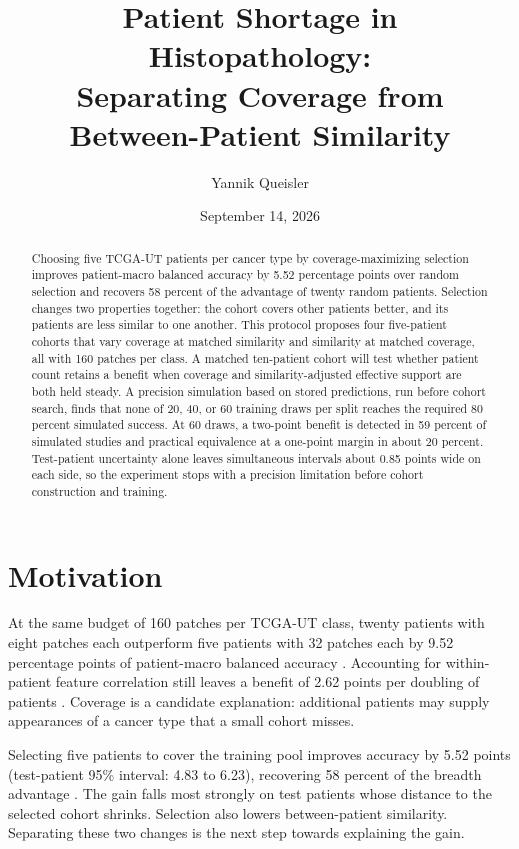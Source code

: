 \documentclass[11pt]{article}
\title{Patient Shortage in Histopathology:\\Separating Coverage from\\Between-Patient Similarity}
\author{Yannik Queisler}
\date{September 14, 2026}
\begin{document}
\raggedbottom
{}
\setlength{\emergencystretch}{2em}
\maketitle
\begin{abstract}
\noindent Choosing five TCGA-UT patients per cancer type by coverage-maximizing selection improves patient-macro balanced accuracy by 5.52 percentage points over random selection and recovers 58 percent of the advantage of twenty random patients. Selection changes two properties together: the cohort covers other patients better, and its patients are less similar to one another. This protocol proposes four five-patient cohorts that vary coverage at matched similarity and similarity at matched coverage, all with 160 patches per class. A matched ten-patient cohort will test whether patient count retains a benefit when coverage and similarity-adjusted effective support are both held steady. A precision simulation based on stored predictions, run before cohort search, finds that none of 20, 40, or 60 training draws per split reaches the required 80 percent simulated success. At 60 draws, a two-point benefit is detected in 59 percent of simulated studies and practical equivalence at a one-point margin in about 20 percent. Test-patient uncertainty alone leaves simultaneous intervals about 0.85 points wide on each side, so the experiment stops with a precision limitation before cohort construction and training.
\end{abstract}
\setcounter{tocdepth}{1}
\tableofcontents
\clearpage

\section{Motivation}
\label{sec:motivation}
At the same budget of 160 patches per TCGA-UT class, twenty patients with eight patches each outperform five patients with 32 patches each by 9.52 percentage points of patient-macro balanced accuracy \citep{queisler2026effectiveSupport}. Accounting for within-patient feature correlation still leaves a benefit of 2.62 points per doubling of patients \citep{queisler2026multidirectionalRedundancy}. Coverage is a candidate explanation: additional patients may supply appearances of a cancer type that a small cohort misses.

Selecting five patients to cover the training pool improves accuracy by 5.52 points (test-patient 95\% interval: 4.83 to 6.23), recovering 58 percent of the breadth advantage \citep{queisler2026shortageSelection}. The gain falls most strongly on test patients whose distance to the selected cohort shrinks. Selection also lowers between-patient similarity. Separating these two changes is the next step towards explaining the gain.
\end{document}
